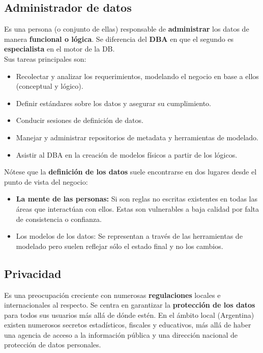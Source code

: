 \subsection*{Administrador de datos}
Es una persona (o conjunto de ellas) responsable de \textbf{administrar} los datos de manera \textbf{funcional o lógica}. Se diferencia del \textbf{DBA} en que el segundo es \textbf{especialista} en el motor de la DB. \\
Sus tareas principales son:
\begin{itemize}
    \item Recolectar y analizar los requerimientos, modelando el negocio en base a ellos (conceptual y lógico).
    \item Definir estándares sobre los datos y asegurar su cumplimiento.
    \item Conducir sesiones de definición de datos.
    \item Manejar y administrar repositorios de metadata y herramientas de modelado.
    \item Asistir al DBA en la creación de modelos físicos a partir de los lógicos.
\end{itemize}
Nótese que la \textbf{definición de los datos} suele encontrarse en dos lugares desde el punto de vista del negocio:
\begin{itemize}
    \item \textbf{La mente de las personas:} Si son reglas no escritas existentes en todas las áreas que interactúan con ellos. Estas son vulnerables a baja calidad por falta de consistencia o confianza.
    \item {Los modelos de los datos:} Se representan a través de las herramientas de modelado pero suelen reflejar sólo el estado final y no los cambios.
\end{itemize}

\subsection*{Privacidad}
Es una preocupación creciente con numerosas \textbf{regulaciones} locales e internacionales al respecto. Se centra en garantizar la \textbf{protección de los datos} para todos sus usuarios más allá de dónde estén. En el ámbito local (Argentina) existen numerosos secretos estadísticos, fiscales y educativos, más allá de haber una agencia de acceso a la información pública y una dirección nacional de protección de datos personales.
